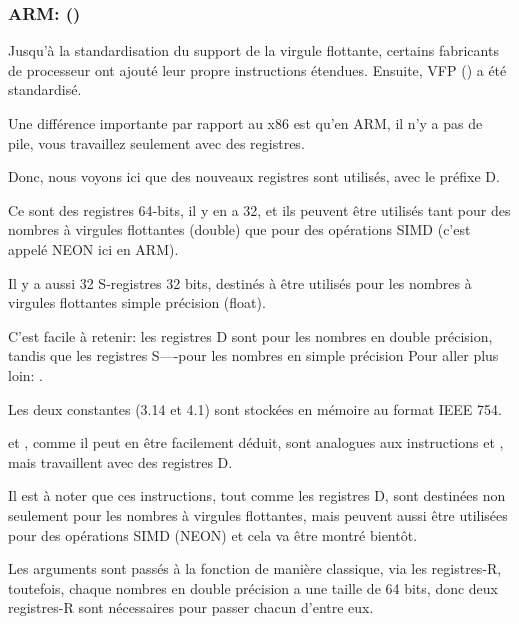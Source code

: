 \subsubsection{ARM: \OptimizingXcodeIV (\ARMMode)}

Jusqu'à la standardisation du support de la virgule flottante, certains fabricants
de processeur ont ajouté leur propre instructions étendues.
Ensuite, VFP () a été standardisé.

Une différence importante par rapport au x86 est qu'en ARM, il n'y a pas de pile,
vous travaillez seulement avec des registres.




Donc, nous voyons ici que des nouveaux registres sont utilisés, avec le préfixe D.

Ce sont des registres 64-bits, il y en a 32, et ils peuvent être utilisés tant pour
des nombres à virgules flottantes (double) que pour des opérations SIMD (c'est appelé
NEON ici en ARM).

Il y a aussi 32 S-registres 32 bits, destinés à être utilisés pour les nombres à
virgules flottantes simple précision (float).

C'est facile à retenir: les registres D sont pour les nombres en double précision,
tandis que les registres S----pour les nombres en simple précision
Pour aller plus loin: .

Les deux constantes (3.14 et 4.1) sont stockées en mémoire au format IEEE 754.

 et , comme il peut en être facilement déduit, sont analogues
aux instructions  et \MOV, mais travaillent avec des registres D.

Il est à noter que ces instructions, tout comme les registres D, sont destinées non
seulement pour les nombres à virgules flottantes, mais peuvent aussi être utilisées
pour des opérations SIMD (NEON) et cela va être montré bientôt.

Les arguments sont passés à la fonction de manière classique, via les registres-R,
toutefois, chaque nombres en double précision a une taille de 64 bits, donc deux
registres-R sont nécessaires pour passer chacun d'entre eux.

